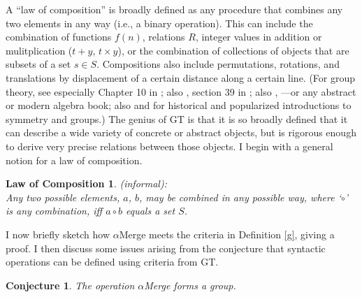 \documentclass[11pt,twoside]{article}
\begin{document}
A ``law of composition'' is broadly defined as any procedure that combines any two elements in any way (i.e., a binary operation). This can include the combination of functions $f(n)$,  relations $R$, integer values in addition or mulitplication ($t + y$, $t \times y$), or the combination of collections of objects that are subsets of a set $s \in S$. Compositions also include permutations, rotations, and translations by displacement of a certain distance along a certain line. (For group theory, see especially Chapter 10 in \cite{pmw:1990}; also \cite{milne:2008}, section 39 in \cite{kleene:1967}; also \cite{korfhage:1974}, \cite{dornhoffhohn:1978}---or any abstract or modern algebra book; also \cite{livio:2005} and \cite{stewart:2007} for historical and popularized introductions to symmetry and groups.) The genius of GT is that it is so broadly defined that it can describe a wide variety of concrete or abstract objects, but is rigorous enough to derive very precise relations between those objects. I begin with a general notion for a law of composition.

\newtheorem*{comp}{Law of Composition}
\begin{comp}
\textsc(informal):\\
Any two possible elements, $a$, $b$, may be combined in any possible way, where `$\circ$' is any combination, iff $a \circ b$ equals a set $S$.
\end{comp}

I now briefly sketch how $\alpha$Merge meets the criteria in Definition \ref{g}, giving a proof. I then discuss some issues arising from the conjecture that syntactic operations can be defined using criteria from GT.

\newtheorem{gmerge}{Conjecture}
\begin{gmerge}
The operation $\alpha$Merge forms a group.
\end{gmerge}
\end{document}
